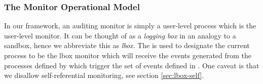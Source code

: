 
% 
% 
% 
% 
% 
% 

\subsubsection{The Monitor Operational Model}

In our framework, an auditing monitor is simply a user-level process
which is the user-level monitor.
It can be thought of as a {\em logging box} in an analogy to
a sandbox, hence we abbreviate this as {\em lbox}.
The  is used to designate
the current process to be the lbox monitor which will
receive the events generated from the processes defined by 
which trigger the set of events defined in .
One caveat is that we disallow self-referential monitoring, see
section \ref{sec:lbox-self}.

